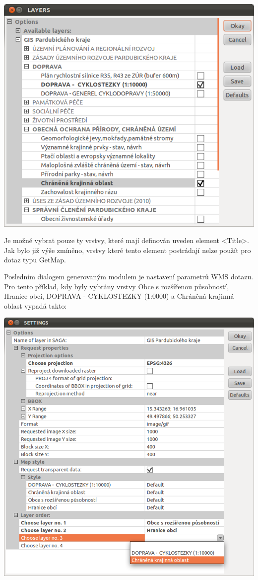 \documentclass[a4paper,12pt]{article}
\begin{document}
 \includegraphics[scale=0.6]{figures/SAGA_okno2.png}
 
Je možné vybrat pouze ty vrstvy, které mají definován uveden element
<Title>. Jak bylo již výše zmíněno, vrstvy které tento element
postrádají nelze použít pro dotaz typu GetMap.
 
 
 Posledním dialogem generovaným modulem je nastavení parametrů WMS
 dotazu.  Pro tento příklad, kdy byly vybrány vrstvy Obce s rozšířenou
 působností, Hranice obcí, DOPRAVA - CYKLOSTEZKY (1:0000) a Chráněná
 krajinná oblast vypadá takto:
 
  \includegraphics[scale=0.6]{figures/SAGA_okno3.png}
\end{document}
